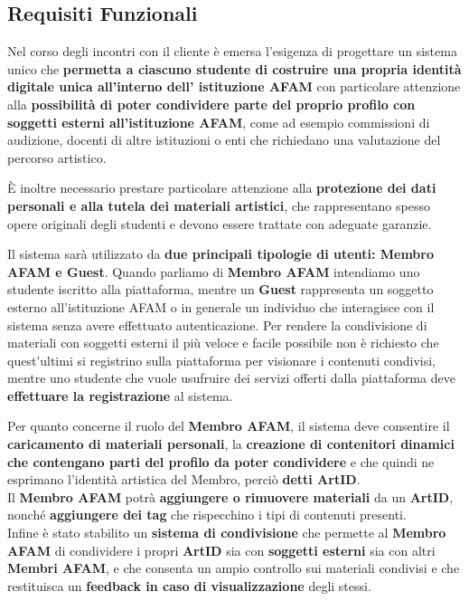 \subsection{Requisiti Funzionali}
Nel corso degli incontri con il cliente è emersa l'esigenza di progettare un sistema unico che \textbf{permetta a ciascuno studente di costruire una propria identità digitale unica all'interno dell' istituzione AFAM}
con particolare attenzione alla \textbf{possibilità di poter condividere parte del proprio profilo con soggetti esterni all'istituzione AFAM}, come ad esempio commissioni di audizione, docenti di altre istituzioni o enti che richiedano una valutazione del percorso artistico.

\`E inoltre necessario prestare particolare attenzione alla \textbf{protezione dei dati personali e alla tutela dei materiali artistici}, che rappresentano spesso opere originali degli studenti e devono essere trattate con adeguate garanzie.

Il sistema sarà utilizzato da \textbf{due principali tipologie di utenti: Membro AFAM e Guest}.
Quando parliamo di \textbf{Membro AFAM} intendiamo uno studente iscritto alla piattaforma, mentre un \textbf{Guest} rappresenta un soggetto esterno all'istituzione AFAM o in generale un individuo che interagisce con il sistema senza avere effettuato autenticazione.
Per rendere la condivisione di materiali con soggetti esterni il più veloce e facile possibile non è richiesto che quest'ultimi si registrino sulla piattaforma per visionare i contenuti condivisi, mentre uno studente che vuole usufruire dei servizi offerti dalla piattaforma deve \textbf{effettuare la registrazione} al sistema.


Per quanto concerne il ruolo del \textbf{Membro AFAM}, il sistema deve consentire il \textbf{caricamento di materiali personali}, la \textbf{creazione di 
contenitori dinamici che contengano parti del profilo da poter condividere} e che quindi ne esprimano l'identità artistica del Membro, perciò \textbf{detti ArtID}. \\
Il \textbf{Membro AFAM} potrà \textbf{aggiungere o rimuovere materiali} da un \textbf{ArtID}, nonché \textbf{aggiungere dei tag} che rispecchino i tipi di contenuti presenti.\\
Infine è stato stabilito un \textbf{sistema di condivisione} che permette al \textbf{Membro AFAM} di condividere i propri \textbf{ArtID} sia con \textbf{soggetti esterni} sia con altri \textbf{Membri AFAM}, e che consenta un ampio controllo sui materiali condivisi e che restituisca un \textbf{feedback in caso di visualizzazione} degli stessi.

